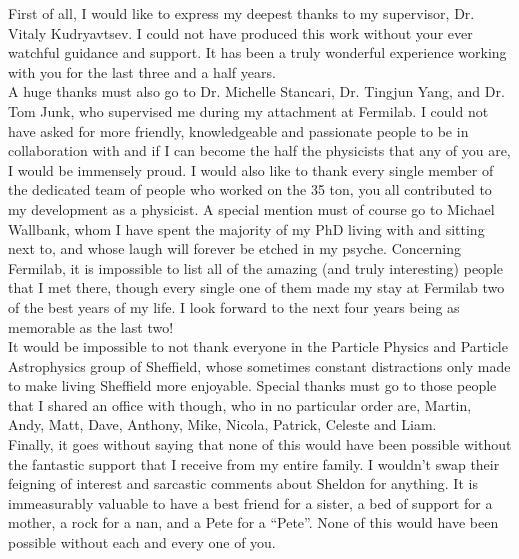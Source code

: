
\begin{acknowledgements}      

  First of all, I would like to express my deepest thanks to my supervisor, Dr. Vitaly Kudryavtsev. I could not have produced this work without your ever watchful guidance and support. It has been a truly wonderful experience working with you for the last three and a half years. \\
  
  A huge thanks must also go to Dr. Michelle Stancari, Dr. Tingjun Yang, and Dr. Tom Junk, who supervised me during my attachment at Fermilab. I could not have asked for more friendly, knowledgeable and passionate people to be in collaboration with and if I can become the half the physicists that any of you are, I would be immensely proud. I would also like to thank every single member of the dedicated team of people who worked on the 35 ton, you all contributed to my development as a physicist. A special mention must of course go to Michael Wallbank, whom I have spent the majority of my PhD living with and sitting next to, and whose laugh will forever be etched in my psyche. Concerning Fermilab, it is impossible to list all of the amazing (and truly interesting) people that I met there, though every single one of them made my stay at Fermilab two of the best years of my life. I look forward to the next four years being as memorable as the last two! \\

  It would be impossible to not thank everyone in the Particle Physics and Particle Astrophysics group of Sheffield, whose sometimes constant distractions only made to make living Sheffield more enjoyable. Special thanks must go to those people that I shared an office with though, who in no particular order are, Martin, Andy, Matt, Dave, Anthony, Mike, Nicola, Patrick, Celeste and Liam. \\

  Finally, it goes without saying that none of this would have been possible without the fantastic support that I receive from my entire family. I wouldn't swap their feigning of interest and sarcastic comments about Sheldon for anything. It is immeasurably valuable to have a best friend for a sister, a bed of support for a mother, a rock for a nan, and a Pete for a ``Pete''. None of this would have been possible without each and every one of you. \\

\end{acknowledgements}
